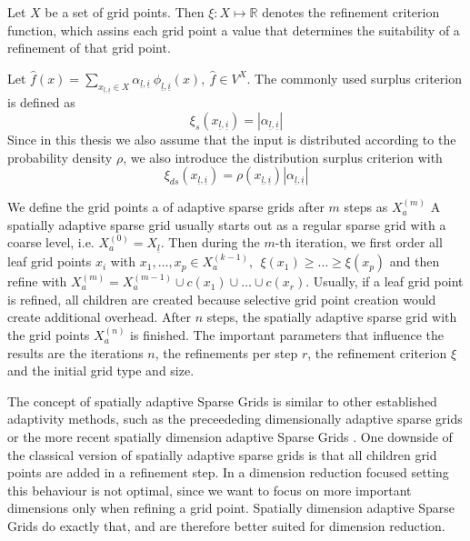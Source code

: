 \documentclass[
  a4paper,  %
  twoside,  %
  bibliography=totoc,
  headsepline,
  cleardoublepage=empty,
  parskip=half,
  draft=false
]{scrbook}
\begin{document}
\begin{definition}
Let $X$ be a set of grid points.
Then $\xi \colon X \mapsto \mathds{R}$ denotes the refinement criterion function, which assins each grid point a value that determines the suitability of a refinement of that grid point.

Let $\hat{f}(x) = \sum_{x_{\underline{l},\underline{i}} \in X} \alpha_{\underline{l},\underline{i}} ~ \phi_{
\underline{l},\underline{i}}(x), ~\hat{f} \in V^X$.
The commonly used surplus criterion is defined as
\begin{equation}
\xi_s(x_{\underline{l},\underline{i}}) = |\alpha_{\underline{l},\underline{i}}|
\end{equation}
Since in this thesis we also assume that the input is distributed according to the probability density $\rho$, we also introduce the distribution surplus criterion with
\begin{equation}
\xi_{ds}(x_{\underline{l},\underline{i}}) =\rho(x_{\underline{l},\underline{i}}) |\alpha_{\underline{l},\underline{i}}|
\end{equation}
\end{definition}
We define the grid points a of adaptive sparse grids after $m$ steps as $X_a^{(m)}$
A spatially adaptive sparse grid usually starts out as a regular sparse grid with a coarse level, i.e. $X_a^{(0)}=X_{\underline{l}}$.
Then during the $m$-th iteration, we first order all leaf grid points $x_i$ with $x_1, \dots, x_p \in X_a^{(k-1)}, ~~ \xi(x_1) \geq \dots \geq \xi(x_p)$ and then refine with $X_a^{(m)}=X_a^{(m-1)} \cup c(x_1) \cup \dots \cup c(x_r)$.
Usually, if a leaf grid point is refined, all children are created because selective grid point creation would create additional overhead.
After $n$ steps, the spatially adaptive sparse grid with the grid points $X_a^{(n)}$ is finished.
The important parameters that influence the results are the iterations $n$, the refinements per step $r$, the refinement criterion $\xi$ and the initial grid type and size.

The concept of spatially adaptive Sparse Grids is similar to other established adaptivity methods, such as the preceededing dimensionally adaptive sparse grids \cite{} or the more recent spatially dimension adaptive Sparse Grids \cite{}.
One downside of the classical version of spatially adaptive sparse grids is that all children grid points are added in a refinement step.
In a dimension reduction focused setting this behaviour is not optimal, since we want to focus on more important dimensions only when refining a grid point.
Spatially dimension adaptive Sparse Grids do exactly that, and are therefore better suited for dimension reduction.
\end{document}
